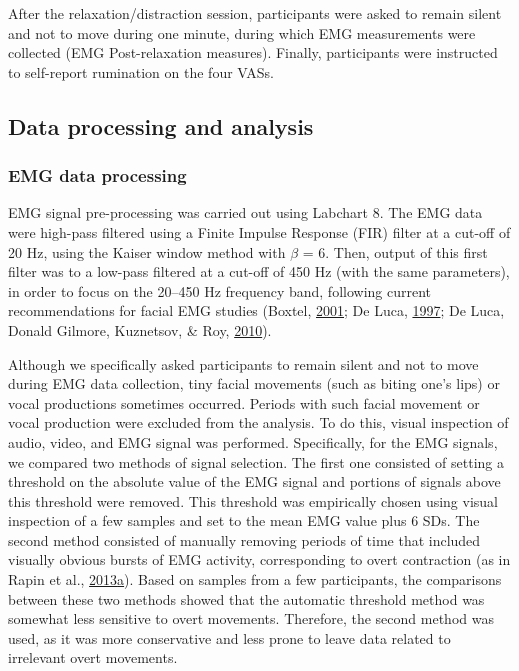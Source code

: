 \documentclass[a4paper,12pt,twoside,openright,oldfontcommands,final]{memoir}
\begin{document}
After the relaxation/distraction session, participants were asked to remain silent and not to move during one minute, during which EMG measurements were collected (EMG Post-relaxation measures). Finally, participants were instructed to self-report rumination on the four VASs.

\hypertarget{data-processing-and-analysis}{%
\subsection{Data processing and analysis}\label{data-processing-and-analysis}}

\hypertarget{emg-data-processing}{%
\subsubsection{EMG data processing}\label{emg-data-processing}}

EMG signal pre-processing was carried out using Labchart 8. The EMG data were high-pass filtered using a Finite Impulse Response (FIR) filter at a cut-off of 20 Hz, using the Kaiser window method with \(\beta\) = 6. Then, output of this first filter was to a low-pass filtered at a cut-off of 450 Hz (with the same parameters), in order to focus on the 20--450 Hz frequency band, following current recommendations for facial EMG studies (Boxtel, \protect\hyperlink{ref-boxtel_optimal_2001}{2001}; De Luca, \protect\hyperlink{ref-de_luca_use_1997}{1997}; De Luca, Donald Gilmore, Kuznetsov, \& Roy, \protect\hyperlink{ref-de_luca_filtering_2010}{2010}).

Although we specifically asked participants to remain silent and not to move during EMG data collection, tiny facial movements (such as biting one's lips) or vocal productions sometimes occurred. Periods with such facial movement or vocal production were excluded from the analysis. To do this, visual inspection of audio, video, and EMG signal was performed. Specifically, for the EMG signals, we compared two methods of signal selection. The first one consisted of setting a threshold on the absolute value of the EMG signal and portions of signals above this threshold were removed. This threshold was empirically chosen using visual inspection of a few samples and set to the mean EMG value plus 6 SDs. The second method consisted of manually removing periods of time that included visually obvious bursts of EMG activity, corresponding to overt contraction (as in Rapin et al., \protect\hyperlink{ref-rapin_emg_2013}{2013}\protect\hyperlink{ref-rapin_emg_2013}{a}). Based on samples from a few participants, the comparisons between these two methods showed that the automatic threshold method was somewhat less sensitive to overt movements. Therefore, the second method was used, as it was more conservative and less prone to leave data related to irrelevant overt movements.
\end{document}
